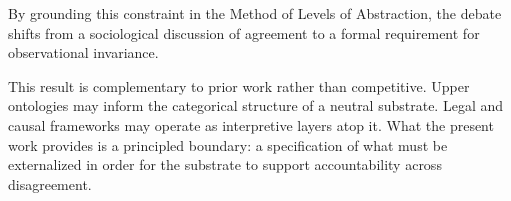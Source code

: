 By grounding this constraint in the Method of Levels of Abstraction,
the debate shifts from a sociological discussion of agreement
to a formal requirement for observational invariance.

This result is complementary to prior work rather than competitive.
Upper ontologies may inform the categorical structure of a neutral substrate.
Legal and causal frameworks may operate as interpretive layers atop it.
What the present work provides is a principled boundary:
a specification of what must be externalized
in order for the substrate to support accountability across disagreement.
